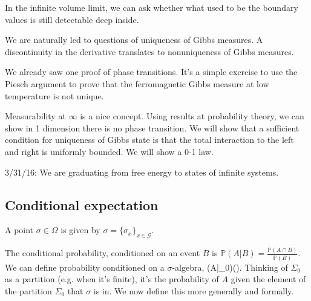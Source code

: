 \documentclass[12pt]{book}
\theoremstyle{norm}
\begin{document}
In the infinite volume limit, we can ask whether what used to be the boundary values is still detectable deep inside.

We are naturally led to questions of uniqueness of Gibbs measures. A discontinuity in the derivative translates to nonuniqueness of Gibbs measures.

We already saw one proof of phase transitions. It's a simple exercise to use the Piesch argument to prove that the ferromagnetic Gibbs measure at low temperature is not unique.

Measurability at $\infty$ is a nice concept. Using results at probability theory, we can show in 1 dimension there is no phase transition. We will show that a sufficient condition for uniqueness of Gibbs state is that the total interaction to the left and right is uniformly bounded. We will show a 0-1 law.





{\color{blue}3/31/16: We are graduating from free energy to states of infinite systems.}

\subsection{Conditional expectation}

A point $\sigma\in \Omega$ is given by $\sigma=\{\sigma_x\}_{x\in \mathcal{G}}$. 

The conditional probability, conditioned on an event $B$ is $\mathbb{P}(A|B) = \frac{\mathbb{P}(A\cap B)}{\mathbb{P}(B)}$. 
We can define probability conditioned on a $\sigma$-algebra,
\be
{}(A|\Sigma_0)(\sigma).
\ee
Thinking of $\Sigma_0$ as a partition (e.g. when it's finite),  it's the probability of $A$ given the element of the partition $\Sigma_0$ that $\sigma$ is in. We now define this more generally and formally.
\end{document}
